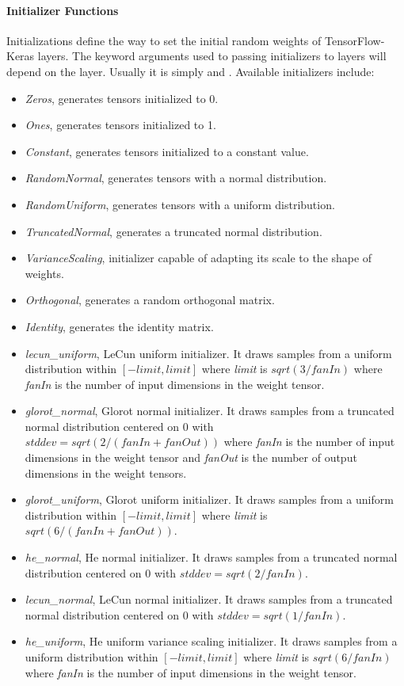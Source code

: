 \paragraph{Initializer Functions}
\label{initializersDNN}
Initializations define the way to set the initial random weights of TensorFlow-Keras layers. The keyword
arguments used to passing initializers to layers will depend on the layer. Usually it is simply
 and .
Available initializers include:
\begin{itemize}
  \item \textit{Zeros}, generates tensors initialized to 0.
  \item \textit{Ones}, generates tensors initialized to 1.
  \item \textit{Constant}, generates tensors initialized to a constant value.
  \item \textit{RandomNormal}, generates tensors with a normal distribution.
  \item \textit{RandomUniform}, generates tensors with a uniform distribution.
  \item \textit{TruncatedNormal}, generates a truncated normal distribution.
  \item \textit{VarianceScaling}, initializer capable of adapting its scale to the shape of weights.
  \item \textit{Orthogonal}, generates a random orthogonal matrix.
  \item \textit{Identity}, generates the identity matrix.
  \item \textit{lecun\_uniform}, LeCun uniform initializer.
    It draws samples from a uniform distribution within
    $[-limit, limit]$ where \textit{limit} is $sqrt(3/fanIn)$ where \textit{fanIn} is the number of input dimensions
    in the weight tensor.
  \item \textit{glorot\_normal}, Glorot normal initializer.
    It draws samples from a truncated normal distribution
    centered on 0 with $stddev = sqrt(2/(fanIn + fanOut))$ where \textit{fanIn} is the number of input dimensions
    in the weight tensor and \textit{fanOut} is the number of output dimensions in the weight tensors.
  \item \textit{glorot\_uniform}, Glorot uniform initializer.
    It draws samples from a uniform distribution within
    $[-limit, limit]$ where \textit{limit} is $sqrt(6/(fanIn+fanOut))$.
  \item \textit{he\_normal}, He normal initializer.
    It draws samples from a truncated normal distribution
    centered on 0 with $stddev = sqrt(2/fanIn)$.
  \item \textit{lecun\_normal}, LeCun normal initializer.
    It draws samples from a truncated normal distribution
    centered on 0 with $stddev = sqrt(1/fanIn)$.
  \item \textit{he\_uniform}, He uniform variance scaling initializer.
    It draws samples from a uniform distribution within
    $[-limit, limit]$ where \textit{limit} is $sqrt(6/fanIn)$ where \textit{fanIn} is the number of input dimensions
    in the weight tensor.
\end{itemize}

